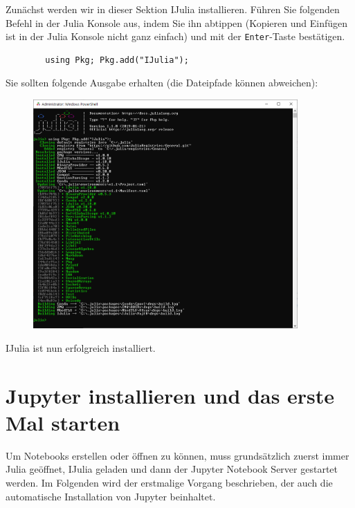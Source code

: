 \documentclass[11pt, a4paper]{scrartcl}
\begin{document}
	
	Zunächst werden wir in dieser Sektion IJulia installieren. Führen Sie folgenden Befehl in der Julia Konsole aus, indem Sie ihn abtippen (Kopieren und Einfügen ist in der Julia Konsole nicht ganz einfach) und mit der \texttt{Enter}-Taste bestätigen.
	
	\begin{lstlisting}
		using Pkg; Pkg.add("IJulia");
	\end{lstlisting}

	Sie sollten folgende Ausgabe erhalten (die Dateipfade können abweichen):
	
	\begin{figure}[h!]
	\centering
	\includegraphics[width=0.9\textwidth]{imgs/IJulia_install.png}
	\end{figure}

	IJulia ist nun erfolgreich installiert.
	
	
	
	
	
	
	
	
	
	
	
	
	
	\section{Jupyter installieren und das erste Mal starten}
	
	Um Notebooks erstellen oder öffnen zu können, muss grundsätzlich zuerst immer Julia geöffnet, IJulia geladen und dann der Jupyter Notebook Server gestartet werden. Im Folgenden wird der erstmalige Vorgang beschrieben, der auch die automatische Installation von Jupyter beinhaltet. 
	
\end{document}
